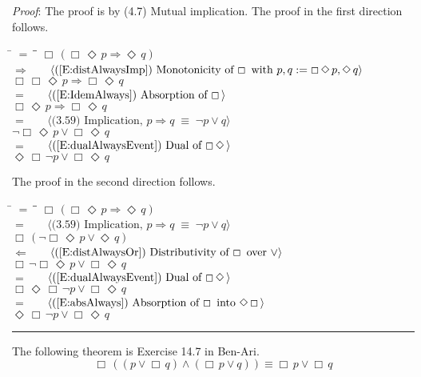 \documentclass[12pt, fleqn, leqno]{article}
\newcommand{\lgap}{2pt}                             %
\newcommand{\mymathindent}{24pt}                    %
\newcommand{\equivs}{\ensuremath{\;\equiv\;}}       %
\newcommand{\impl}{\ensuremath{\Rightarrow}}        %
\newcommand{\foll}{\ensuremath{\Leftarrow}}         %
\newcommand{\Event}{\Diamond\,}
\newcommand{\Always}{\Box\,}
\newcommand{\myqed}{\rule[-.23ex]{1.2ex}{2.0ex}}
\newcommand{\myqedtab}{\hspace{384pt}}              %
\newcommand{\Gll} {\langle}                         %
\newcommand{\Ggg} {\rangle}                         %
\newcommand{\Hint}[1]     {\ \ \ $\Gll              \mbox{#1} \Ggg$ }   %
\begin{document}
\emph{Proof}: The proof is by (4.7) Mutual implication.
The proof in the first direction follows.
\begin{tabbing}
\hspace{\mymathindent} \= $= \;$ \= \myqedtab \= \kill
  \> \>   $\Always (\Always\Event p \impl \Event q)$\\[\lgap]
  \> $\impl$  \>  \Hint{(\ref{E:distAlwaysImp}) Monotonicity of $\Always$ with $p,q := \Always\Event p, \Event q$}\\[\lgap]
  \> \>   $\Always\Always\Event p \impl \Always\Event q$\\[\lgap]
   \> $=$  \>  \Hint{(\ref{E:IdemAlways}) Absorption of $\Always$}\\[\lgap]
 \> \>   $\Always\Event p \impl \Always\Event q$\\[\lgap]
 \> $=$  \>  \Hint{(3.59) Implication, $p\impl q \equivs \neg p \lor q$}\\[\lgap]
 \> \>   $\neg\Always\Event p \lor \Always\Event q$\\[\lgap]
  \> $=$  \>  \Hint{(\ref{E:dualAlwaysEvent}) Dual of $\Always \Event$}\\[\lgap]
  \> \>   $\Event\Always\neg p \lor \Always\Event q$
\end{tabbing}
The proof in the second direction follows.
\begin{tabbing}
\hspace{\mymathindent} \= $= \;$ \= \myqedtab \= \kill
 \> \>   $\Always (\Always\Event p \impl \Event q)$\\[\lgap]
 \> $=$  \>  \Hint{(3.59) Implication, $p\impl q \equivs \neg p \lor q$}\\[\lgap]
 \> \>   $\Always (\neg\Always\Event p \lor \Event q)$\\[\lgap]
  \> $\foll$  \>  \Hint{(\ref{E:distAlwaysOr}) Distributivity of $\Always$ over $\lor$}\\[\lgap]
  \> \>   $\Always\neg\Always\Event p \lor \Always\Event q$\\[\lgap]
   \> $=$  \>  \Hint{(\ref{E:dualAlwaysEvent}) Dual of $\Always \Event$}\\[\lgap]
 \> \>   $\Always\Event\Always\neg p \lor \Always\Event q$\\[\lgap]
  \> $=$  \>  \Hint{(\ref{E:absAlways}) Absorption of $\Always$ into $\Event\Always$}\\[\lgap]
  \> \>   $\Event\Always\neg p \lor \Always\Event q$ \quad \myqed
\end{tabbing}

The following theorem is Exercise 14.7 in Ben-Ari. \cite{Ben}
\begin{equation}\label{E:BenAriequiv2}
\Always ((p \lor \Always q) \land (\Always p \lor q)) \equiv \Always p \lor \Always q
\end{equation}
\end{document}
